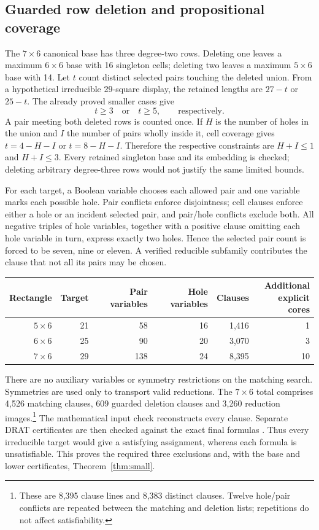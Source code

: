 \documentclass[11pt,a4paper]{article}
\theoremstyle{definition}
\begin{document}
\subsection{Guarded row deletion and propositional coverage}

The $7\times6$ canonical base has three degree-two rows. Deleting one
leaves a maximum $6\times6$ base with 16 singleton cells; deleting two
leaves a maximum $5\times6$ base with 14. Let $t$ count distinct selected
pairs touching the deleted union. From a hypothetical irreducible
29-square display, the retained lengths are $27-t$ or $25-t$.
The already proved smaller cases give
\begin{equation}\label{eq:deletioncuts}
 t\ge3\quad\text{or}\quad t\ge5,
 \qquad\text{respectively}.
\end{equation}
A pair meeting both deleted rows is counted once. If $H$ is the number
of holes in the union and $I$ the number of pairs wholly inside it,
cell coverage gives $t=4-H-I$ or $t=8-H-I$. Therefore the respective
constraints are $H+I\le1$ and $H+I\le3$. Every retained singleton base
and its embedding is checked; deleting arbitrary degree-three rows
would not justify the same limited bounds.

For each target, a Boolean variable chooses each allowed pair and one
variable marks each possible hole. Pair conflicts enforce disjointness;
cell clauses enforce either a hole or an incident selected pair, and
pair/hole conflicts exclude both. All negative triples of hole variables,
together with a positive clause omitting each hole variable in turn,
express exactly two holes. Hence the selected pair count is forced to
be seven, nine or eleven. A verified reducible subfamily contributes
the clause that not all its pairs may be chosen.

\begin{center}
\begin{tabular}{rrrrrr}
\toprule
Rectangle&Target&Pair variables&Hole variables&Clauses&\shortstack{Additional\\explicit cores}\\
\midrule
$5\times6$&21&58&16&1,416&1\\
$6\times6$&25&90&20&3,070&3\\
$7\times6$&29&138&24&8,395&10\\
\bottomrule
\end{tabular}
\end{center}
There are no auxiliary variables or symmetry restrictions on the
matching search. Symmetries are used only to transport valid reductions.
The $7\times6$ total comprises 4,526 matching clauses, 609 guarded
deletion clauses and 3,260 reduction images.\footnote{These are 8,395
clause lines and 8,383 distinct clauses. Twelve hole/pair conflicts are
repeated between the matching and deletion lists; repetitions do not
affect satisfiability.} The mathematical input
check reconstructs every clause. Separate DRAT certificates are then
checked against the exact final formulas \cite{DRAT}. Thus every
irreducible target would give a satisfying assignment, whereas each
formula is unsatisfiable. This proves the required three exclusions and,
with the base and lower certificates, Theorem~\ref{thm:small}.
\end{document}

